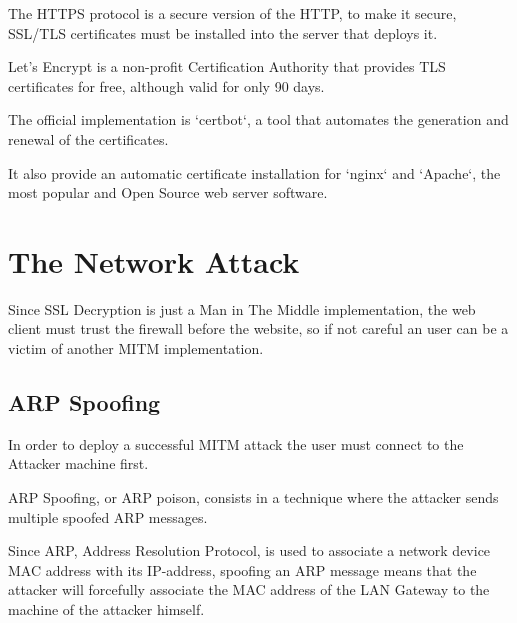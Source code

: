 \documentclass[status=normal,cover=tesi,language=en]{gmeepd}
\begin{document}
The HTTPS protocol is a secure version of the HTTP, to make it secure, SSL/TLS certificates must be installed into the server that deploys it.

Let's Encrypt is a non-profit Certification Authority that provides TLS certificates for free, although valid for only 90 days.

The official implementation is `certbot`, a tool that automates the generation and renewal of the certificates.

It also provide an automatic certificate installation for `nginx` and `Apache`, the most popular and Open Source web server software.

\section{The Network Attack}

Since SSL Decryption is just a Man in The Middle implementation, the web client must trust the firewall before the website, so if not careful an user can be a victim of another MITM implementation.

\pagebreak

\subsection{ARP Spoofing}

In order to deploy a successful MITM attack the user must connect to the Attacker machine first.

ARP Spoofing, or ARP poison, consists in a technique where the attacker sends multiple spoofed ARP messages.

Since ARP, Address Resolution Protocol, is used to associate a network device MAC address with its IP-address, spoofing an ARP message means that the attacker will forcefully associate the MAC address of the LAN Gateway to the machine of the attacker himself.
\end{document}
